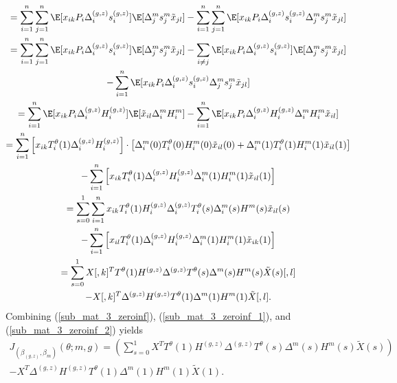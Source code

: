 \documentclass[11pt]{article}
\begin{document}
\begin{appendices}
\begin{refsection}
\begin{multline}
= \sum_{i=1}^n \sum_{j=1}^n \E [x_{ik} P_i \Delta^{(g,z)}_i s^{(g,z)}_i] \E[\Delta^m_js^m_j \tilde{x}_{jl}] - \sum_{i=1}^n \sum_{j=1}^n \E[x_{ik} P_i \Delta^{(g,z)}_i s^{(g,z)}_i \Delta^m_j s^m_j \tilde{x}_{jl}] \\
= \sum_{i=1}^n \sum_{j=1}^n \E [x_{ik} P_i \Delta^{(g,z)}_i s^{(g,z)}_i ] \E[\Delta^m_js^m_j \tilde{x}_{jl}] - \sum_{i \neq j} \E [x_{ik} P_i \Delta^{(g,z)}_i s^{(g,z)}_i] \E[\Delta^m_js^m_j \tilde{x}_{jl}] \\ - \sum_{i=1}^n \E[x_{ik} P_i \Delta^{(g,z)}_i s^{(g,z)}_i \Delta^m_j s^m_j \tilde{x}_{jl}] \\
= \sum_{i=1}^n \E[x_{ik} P_i \Delta_i^{(g,z)} H^{(g,z)}_i] \E[\tilde{x}_{il} \Delta^m_i H^m_i] - \sum_{i=1}^n \E[x_{ik} P_i \Delta_i^{(g,z)} H_i^{(g,z)} \Delta_i^m H_i^m \tilde{x}_{il}] \\ 
= \sum_{i=1}^n \left[x_{ik} T_i^\theta(1) \Delta^{(g,z)}_i H^{(g,z)}_i \right] \cdot \left[{\Delta}^m_i(0) T^\theta_i(0) {H}^m_i(0) \tilde{x}_{il}(0) + {\Delta}^m_i(1) T_i^\theta(1) {H}^m_i(1) \tilde{x}_{il}(1)\right]
\\ - \sum_{i=1}^n \left[x_{ik} T_i^\theta(1) \Delta^{(g,z)}_i H^{(g,z)}_i \Delta^m_i(1) H^m_i(1) \tilde{x}_{il}(1)\right] 
\\ = \sum_{s=0}^1 \sum_{i=1}^n x_{ik} T_i^\theta(1) H_i^{(g,z)} \Delta_i^{(g,z)} T^\theta_i(s) \Delta_i^m(s) H^m(s) \tilde{x}_{il}(s) \\ - \sum_{i=1}^n \left[x_{il}T_i^\theta(1) \Delta^{(g,z)}_i H^{(g,z)}_i \Delta^m_i(1) H^m_i(1) \tilde{x}_{ik}(1)\right] \\ = \sum_{s=0}^1 X[,k]^T T^\theta(1) H^{(g,z)} \Delta^{(g,z)} T^\theta(s)\Delta^m(s)H^m(s) \tilde{X}(s)[,l] \\ - X[,k]^T \Delta^{(g,z)} H^{(g,z)} T^\theta(1)\Delta^m(1) H^m(1) \tilde{X}[,l].
\end{multline}
Combining (\ref{sub_mat_3_zeroinf}), (\ref{sub_mat_3_zeroinf_1}), and (\ref{sub_mat_3_zeroinf_2}) yields
\begin{multline}\label{sub_mat_4_zeroinf_formula} J_{(\beta_{(g,z)}, \beta_m)}(\theta; m, g) = \left(\sum_{s=0}^1 X^T  T^\theta(1) H^{(g,z)} \Delta^{(g,z)} T^\theta(s) \Delta^m(s) H^m(s) \tilde{X}(s) \right) \\ - X^T \Delta^{(g,z)} H^{(g,z)} T^\theta(1) \Delta^m(1)H^m(1) \tilde{X}(1).
\end{multline}


\end{refsection}
\end{appendices}
\end{document}
